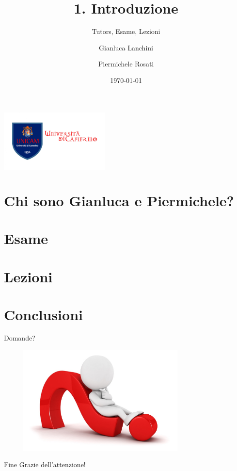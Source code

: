 \documentclass[11pt,aspectratio=169]{beamer}
\author[Gianluca Lanchini \and Piermichele Rosati]{Gianluca Lanchini \and Piermichele Rosati}
\institute[]{\large Universit\`a di Camerino\\ \footnotesize Tutorato - Basi di Dati}
\title[Introduzione]{1. Introduzione}
\subtitle{Tutors, Esame, Lezioni}
\begin{document}
\begin{frame}
\centering
\includegraphics[width=5.5cm]{../img/unicam-logo.jpg}
\date{\today}
\titlepage
\end{frame}


\section{Chi sono Gianluca e Piermichele?}

\section{Esame}

\section{Lezioni}


\section{Conclusioni}

\begin{frame}{Domande?}
    \begin{figure}
\centering
    \includegraphics[width=0.75\textwidth]{../img/questions.jpg}
\end{figure}
\end{frame}

\begin{frame}{Fine}
    \centering
    \huge Grazie dell'attenzione!
\end{frame}
\end{document}

